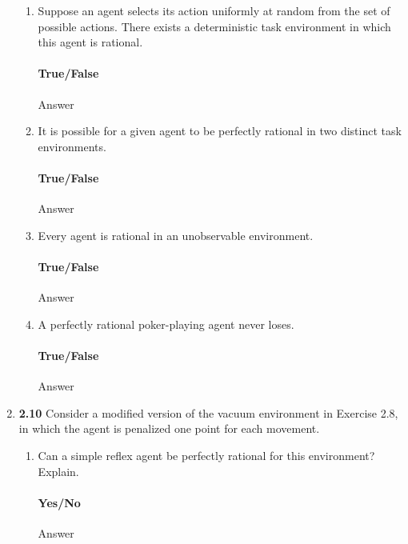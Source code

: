\documentclass[12pt]{article}
\begin{document}
\begin{enumerate}
\begin{enumerate}
  \item Suppose an agent selects its action uniformly at random from the set of possible actions.
  There exists a deterministic task environment in which this agent is rational.\\
  \vspace{-2.5em}
  \paragraph{True/False} Answer

  \item It is possible for a given agent to be perfectly rational in two distinct task environments.\\
  \vspace{-2.5em}
  \paragraph{True/False} Answer

  \item Every agent is rational in an unobservable environment.\\
  \vspace{-2.5em}
  \paragraph{True/False} Answer

  \item A perfectly rational poker-playing agent never loses.\\
  \vspace{-2.5em}
  \paragraph{True/False} Answer
  \end{enumerate}
\newpage

\item \textbf{2.10} Consider a modified version of the vacuum environment in Exercise 2.8, in which the
agent is penalized one point for each movement.
  \begin{enumerate}
  \item Can a simple reflex agent be perfectly rational for this environment? Explain.\\
  \vspace{-2.5em}
  \paragraph{Yes/No} Answer


\end{enumerate}
\end{enumerate}
\end{document}

